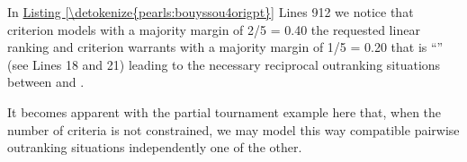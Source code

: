 \documentclass[a4paper,12pt,english]{sphinxhowto}
\begin{document}
\sphinxAtStartPar
In \hyperref[\detokenize{pearls:bouyssou4origpt}]{Listing \ref{\detokenize{pearls:bouyssou4origpt}}} Lines 9\sphinxhyphen{}12 we notice that criterion  models with a majority margin of 2/5 = 0.40 the requested linear ranking and criterion  warrants with a majority margin of 1/5 = 0.20 that  is “”  (see Lines 18 and 21) leading to the necessary reciprocal outranking situations between  and .

\sphinxAtStartPar
It becomes apparent with the partial tournament example here that, when the number of criteria is not constrained, we may model this way compatible pairwise outranking situations independently one of the other.
\end{document}
